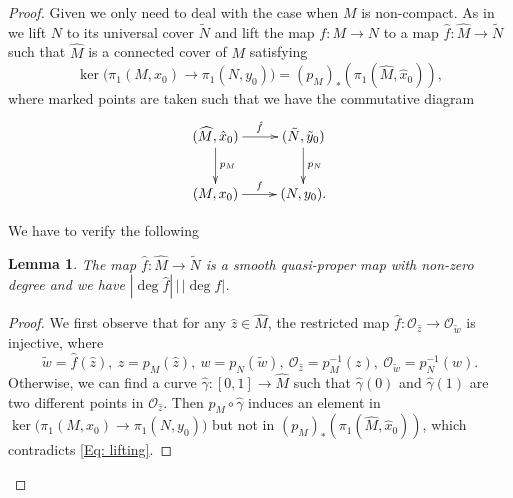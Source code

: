 \documentclass[11pt,letterpaper]{amsart}
\numberwithin{equation}{section}
\newtheorem{lemma}[theorem]{Lemma}
\theoremstyle{definition}
\begin{document}
\begin{proof}
Given \cite[Lemma 19]{CLL23} we only need to deal with the case when $M$ is non-compact. As in \cite[Lemma 18]{CLL23} we lift $N$ to its universal cover $\tilde N$ and lift the map $f:M\to N$ to a map $\hat f:\widehat M\to \tilde N$ such that $\widehat M$ is a connected cover of $M$ satisfying
\begin{equation}\label{Eq: lifting}
\ker\big(\pi_1(M,x_0)\to \pi_1(N,y_0)\big)=(p_M)_*(\pi_1(\widehat M,\hat x_0)),
\end{equation}
where marked points are taken such that we have the commutative diagram
\begin{equation}\label{Eq: lifting diagram}
\begin{split}
\xymatrix{(\widehat M,\hat x_0)\ar[r]^{\hat f}\ar[d]^{p_M}&(\tilde N,\tilde y_0)\ar[d]^{p_N}\\
(M,x_0)\ar[r]^{f}&(N,y_0).}
\end{split}
\end{equation}

We have to verify the following
\begin{lemma}\label{Lem: lifting}
The map	$\hat f:\widehat M\to \tilde N$ is a smooth quasi-proper map with non-zero degree and we have $|\deg \hat f|\,\big|\,|\deg f|$.
\end{lemma}
\begin{proof}
We first observe that for any $\hat{z}\in\widehat{M}$, the restricted map $\hat f:\mathcal O_{\hat z}\to \mathcal O_{\tilde w}$ is injective, where
\[
\tilde{w} = \hat{f}(\hat{z}), \
z = p_{M}(\hat{z}), \
w = p_{N}(\tilde{w}), \
\mathcal O_{\hat z} = p_M^{-1}(z), \
\mathcal O_{\tilde w} = p_N^{-1}(w).
\]
Otherwise, we can find a curve $\hat\gamma:[0,1] \to \widehat M$ such that $\hat\gamma(0)$ and $\hat\gamma(1)$ are two different points in $\mathcal O_{\hat z}$. Then $p_M\circ \hat\gamma$ induces an element in $\ker\big(\pi_1(M,x_0)\to \pi_1(N,y_0)\big)$ but not in $(p_M)_*(\pi_1(\widehat M,\hat x_0))$, which contradicts \eqref{Eq: lifting}.


\end{proof}
\end{proof}
\end{document}
